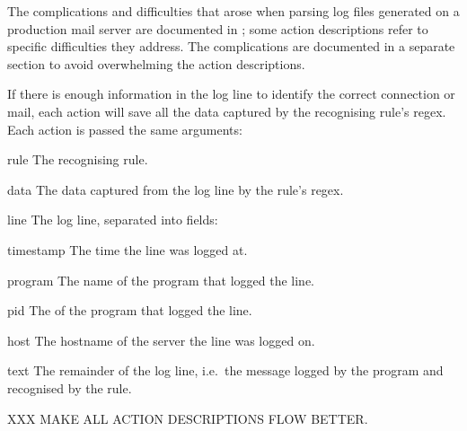The complications and difficulties that arose when parsing log files
generated on a production mail server are documented in
; some action descriptions refer to specific
difficulties they address.  The complications are documented in a separate
section to avoid overwhelming the action descriptions.

If there is enough information in the log line to identify the correct
connection or mail, each action will save all the data captured by the
recognising rule's regex.  Each action is passed the same arguments:

\begin{boldeqlist}

    \squeezeitems{}

    \item [rule] The recognising rule.

    \item [data] The data captured from the log line by the rule's regex.

    \item [line] The log line, separated into fields:

        \begin{boldeqlist}

            \squeezeitems{}

            \item [timestamp] The time the line was logged at.

            \item [program] The name of the program that logged the line.

            \item [pid] The  of the program that logged the
                line.

            \item [host] The hostname of the server the line was logged on.

            \item [text] The remainder of the log line, i.e.\ the message
                logged by the program and recognised by the rule.

        \end{boldeqlist}

\end{boldeqlist}

XXX MAKE ALL ACTION DESCRIPTIONS FLOW BETTER\@.

